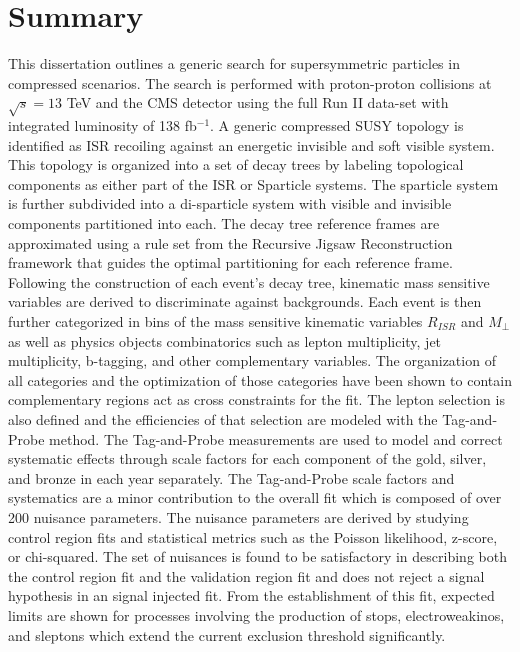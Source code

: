 \setcounter{secnumdepth}{3}
\setcounter{tocdepth}{3}
\setlength{\parskip}{\smallskipamount}
\setlength{\parindent}{0pt}


\makeatletter


\providecommand{\tabularnewline}{\\}


\makeatother


\chapter{Summary}


This dissertation outlines a generic search for supersymmetric particles in compressed scenarios. The search is performed with proton-proton collisions at $\sqrt{s} = 13$ TeV and the CMS detector using the full Run II data-set with integrated luminosity of 138 fb$^{-1}$. A generic compressed SUSY topology is identified as ISR recoiling against an energetic invisible and soft visible system. This topology is organized into a set of decay trees by labeling topological components as either part of the ISR or Sparticle systems. The sparticle system is further subdivided into a di-sparticle system with visible and invisible components partitioned into each. The decay tree reference frames are approximated using a rule set from the Recursive Jigsaw Reconstruction framework that guides the optimal partitioning for each reference frame. Following the construction of each event's decay tree, kinematic mass sensitive variables are derived to discriminate against backgrounds. Each event is then further categorized in bins of the mass sensitive kinematic variables $R_{ISR}$ and $M_\perp$ as well as physics objects combinatorics such as lepton multiplicity, jet multiplicity, b-tagging, and other complementary variables. The organization of all categories and the optimization of those categories have been shown to contain complementary regions act as cross constraints for the fit. The lepton selection is also defined and the efficiencies of that selection are modeled with the Tag-and-Probe method. The Tag-and-Probe measurements are used to  model and correct systematic effects through scale factors for each component of the gold, silver, and bronze in each year separately. The Tag-and-Probe scale factors and systematics are a minor contribution to the overall fit which is composed of over 200 nuisance parameters. The nuisance parameters are derived by studying control region fits and statistical metrics such as the Poisson likelihood, z-score, or chi-squared. The set of nuisances is found to be satisfactory in describing both the control region fit and the validation region fit and does not reject a signal hypothesis in an signal injected fit. From the establishment of this fit, expected limits are shown for processes involving the production of stops, electroweakinos, and sleptons which extend the current exclusion threshold significantly.   

